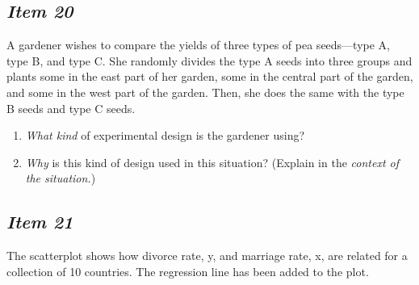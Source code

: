 \subsection{\textbf{\textit{Item 20}}}


A gardener wishes to compare the yields of three types of pea seeds---type A, type B, and type C. She randomly divides the type A seeds into three groups and plants some in the east part of her garden, some in the central part of the garden, and some in the west part of the garden. Then, she does the same with the type B seeds and type C seeds.


\begin{enumerate}[leftmargin=1cm, itemsep=.2em]


\item \textit{What kind} of experimental design is the gardener using?


\item \textit{Why} is this kind of design used in this situation? (Explain in the \textit{context of the situation.})


\end{enumerate}





\subsection{\textbf{\textit{Item 21}}}


The scatterplot shows how divorce rate, y, and marriage rate, x, are related for a collection of 10 countries. The regression line has been added to the plot.





